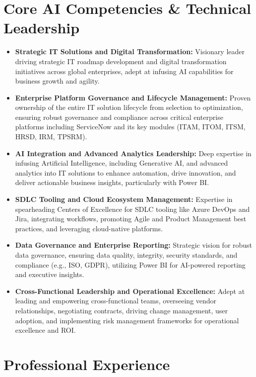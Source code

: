 \documentclass[9pt, letterpaper]{extarticle}
\begin{document}
\section{Core AI Competencies \& Technical Leadership}
\begin{itemize}
\item \textbf{Strategic IT Solutions  and  Digital Transformation:} Visionary leader driving strategic IT roadmap development and digital transformation initiatives across global enterprises, adept at infusing AI capabilities for business growth and agility.\item \textbf{Enterprise Platform Governance  and  Lifecycle Management:} Proven ownership of the entire IT solution lifecycle from selection to optimization, ensuring robust governance and compliance across critical enterprise platforms including ServiceNow and its key modules (ITAM, ITOM, ITSM, HRSD, IRM, TPSRM).\item \textbf{AI Integration  and  Advanced Analytics Leadership:} Deep expertise in infusing Artificial Intelligence, including Generative AI, and advanced analytics into IT solutions to enhance automation, drive innovation, and deliver actionable business insights, particularly with Power BI.\item \textbf{SDLC Tooling  and  Cloud Ecosystem Management:} Expertise in spearheading Centers of Excellence for SDLC tooling like Azure DevOps and Jira, integrating workflows, promoting Agile and Product Management best practices, and leveraging cloud-native platforms.\item \textbf{Data Governance  and  Enterprise Reporting:} Strategic vision for robust data governance, ensuring data quality, integrity, security standards, and compliance (e.g., ISO, GDPR), utilizing Power BI for AI-powered reporting and executive insights.\item \textbf{Cross-Functional Leadership  and  Operational Excellence:} Adept at leading and empowering cross-functional teams, overseeing vendor relationships, negotiating contracts, driving change management, user adoption, and implementing risk management frameworks for operational excellence and ROI.
\end{itemize}

\section{Professional Experience}
\end{document}
